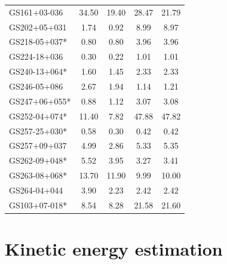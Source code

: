 \documentclass{aa}
\begin{document}
\begin{table}
\begin{tabular}{l c c c c }
  GS161+03-036   	&	34.50	&	19.40	&	28.47	&	21.79	\\
  GS202+05+031   	&	1.74	&	0.92	&	8.99	&	8.97	\\
  GS218-05+037*   	&	0.80	&	0.80	&	3.96	&	3.96	\\
  GS224-18+036   	&	0.30	&	0.22	&	1.01	&	1.01	\\
  GS240-13+064*   	&	1.60	&	1.45	&	2.33	&	2.33	\\
  GS246-05+086   	&	2.67	&	1.94	&	1.14	&	1.21	\\
  GS247+06+055*   	&	0.88	&	1.12	&	3.07	&	3.08	\\
  GS252-04+074*   	&	11.40	&	7.82	&	47.88	&	47.82	\\
  GS257-25+030*   	&	0.58	&	0.30	&	0.42	&	0.42	\\
  GS257+09+037   	&	4.99	&	2.86	&	5.33	&	5.35	\\
  GS262-09+048*   	&	5.52	&	3.95	&	3.27	&	3.41	\\
  GS263-08+068*   	&	13.70	&	11.90	&	9.99	&	10.00	\\
  GS264-04+044   	&	3.90	&	2.23	&	2.42	&	2.42	\\
GS103+07-018*   	&	8.54	&	8.28	&	21.58	&	21.60	\\
\hline
\end{tabular}
\end{table}


\section{Kinetic energy estimation}






 

  
{\typeout{}
\typeout{****************************************************}
\typeout{****************************************************}
\typeout{****************************************************}
\typeout{****************************************************}
\typeout{}
}



\begin{acknowledgements}
      
\end{acknowledgements}
\end{document}
